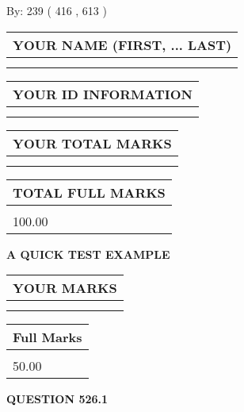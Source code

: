 \documentclass[12pt]{article}
\begin{document}
   
\hspace{1.0in} By: 
 239 ( 416 ,  613 )
   
   
   
   
\newpage 
\setcounter{page}{ 
   526001 } 
   
   
   
   
\noindent\begin{tabular}{|l|}
\hline
YOUR NAME (FIRST, ... LAST)  \\
\hline
 \\ 
 \\ 
\hline
\end{tabular}
\hspace{0.05in} \begin{tabular}{|l|}
\hline
 YOUR   ID   INFORMATION  \\
\hline
 \\ 
 \\ 
\hline
\end{tabular}
   
   
\vspace{0.2in}\noindent\begin{tabular}{|l|}
\hline
YOUR TOTAL MARKS  \\
\hline
 \\ 
 \\ 
\hline
\end{tabular}
\hspace{0.05in} \begin{tabular}{|l|}
\hline
TOTAL FULL MARKS  \\
\hline
 \\ 
100.00 \\
\hline
\end{tabular}
   
   
 \vspace{0.2in}
{\LARGE {\textbf{ A QUICK TEST EXAMPLE}}}
   
   
  
\vspace{0.2in}
  
\noindent\begin{tabular}{|l|}
\hline
 YOUR MARKS  \\
\hline
 \\ 
 \\ 
\hline
\end{tabular}
\hspace{0.05in} \begin{tabular}{|l|}
\hline
 Full Marks  \\
\hline
 \\ 
50.00 \\
\hline
\end{tabular}
{\textbf{\Large{QUESTION
526.1 
}}}
  
\end{document}
